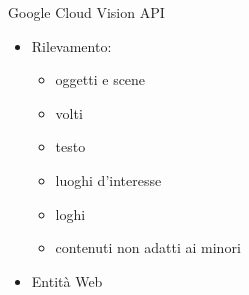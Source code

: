%
\begin{frame}[t]{Google Cloud Vision API}
\begin{itemize}
	\item Rilevamento:
	\begin{itemize}
		\item oggetti e scene
		\item volti
		\item testo
		\item luoghi d'interesse
		\item loghi
		\item contenuti non adatti ai minori
	\end{itemize}
	\item Entità Web
\end{itemize}
\end{frame}
%
